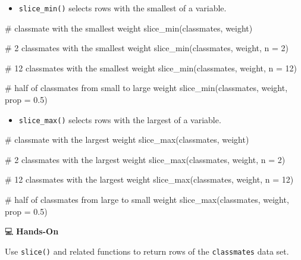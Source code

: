 \documentclass[
  letterpaper,
  DIV=11,
  numbers=noendperiod]{scrreprt}
\newenvironment{Shaded}{\begin{snugshade}}{\end{snugshade}}
\newcommand{\AttributeTok}[1]{\textcolor[rgb]{0.40,0.45,0.13}{#1}}
\newcommand{\CommentTok}[1]{\textcolor[rgb]{0.37,0.37,0.37}{#1}}
\newcommand{\DecValTok}[1]{\textcolor[rgb]{0.68,0.00,0.00}{#1}}
\newcommand{\FloatTok}[1]{\textcolor[rgb]{0.68,0.00,0.00}{#1}}
\newcommand{\FunctionTok}[1]{\textcolor[rgb]{0.28,0.35,0.67}{#1}}
\newcommand{\NormalTok}[1]{\textcolor[rgb]{0.00,0.23,0.31}{#1}}
\providecommand{\tightlist}{%
  \setlength{\itemsep}{0pt}\setlength{\parskip}{0pt}}\usepackage{longtable,booktabs,array}
\begin{document}
\begin{itemize}
\tightlist
\item
  \texttt{slice\_min()} selects rows with the smallest of a variable.
\end{itemize}

\begin{Shaded}
\begin{Highlighting}[]
\CommentTok{\# classmate with the smallest weight}
\FunctionTok{slice\_min}\NormalTok{(classmates, weight)}

\CommentTok{\# 2 classmates with the smallest weight}
\FunctionTok{slice\_min}\NormalTok{(classmates, weight, }\AttributeTok{n =} \DecValTok{2}\NormalTok{)}

\CommentTok{\# 12 classmates with the smallest weight}
\FunctionTok{slice\_min}\NormalTok{(classmates, weight, }\AttributeTok{n =} \DecValTok{12}\NormalTok{)}

\CommentTok{\# half of classmates from small to large weight}
\FunctionTok{slice\_min}\NormalTok{(classmates, weight, }\AttributeTok{prop =} \FloatTok{0.5}\NormalTok{)}
\end{Highlighting}
\end{Shaded}

\begin{itemize}
\tightlist
\item
  \texttt{slice\_max()} selects rows with the largest of a variable.
\end{itemize}

\begin{Shaded}
\begin{Highlighting}[]
\CommentTok{\# classmate with the largest weight}
\FunctionTok{slice\_max}\NormalTok{(classmates, weight)}

\CommentTok{\# 2 classmates with the largest weight}
\FunctionTok{slice\_max}\NormalTok{(classmates, weight, }\AttributeTok{n =} \DecValTok{2}\NormalTok{)}

\CommentTok{\# 12 classmates with the largest weight}
\FunctionTok{slice\_max}\NormalTok{(classmates, weight, }\AttributeTok{n =} \DecValTok{12}\NormalTok{)}

\CommentTok{\# half of classmates from large to small weight}
\FunctionTok{slice\_max}\NormalTok{(classmates, weight, }\AttributeTok{prop =} \FloatTok{0.5}\NormalTok{)}
\end{Highlighting}
\end{Shaded}

💻 \textbf{Hands-On}

Use \texttt{slice()} and related functions to return rows of the
\texttt{classmates} data set.
\end{document}

